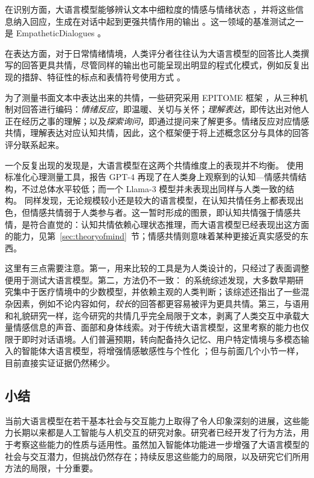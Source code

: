 在识别方面，大语言模型能够辨认文本中细粒度的情感与情绪状态 \citep{broekens2023fine}，并将这些信息纳入回应，生成在对话中起到更强共情作用的输出 \citep{yang2024enhancing, yan2024talkhumanlikeagentsempathetic}。这一领域的基准测试之一是 EmpatheticDialogues \citep{rashkin2019towards}。

在表达方面，对于日常情绪情境，人类评分者往往认为大语言模型的回答比人类撰写的回答更具共情，尽管同样的输出也可能呈现出明显的程式化模式，例如反复出现的措辞、特征性的标点和表情符号使用方式 \citep{lee2024large}。

为了测量书面文本中表达出来的共情，一些研究采用 EPITOME 框架 \citep{sharma2020computational}，从三种机制对回答进行编码：\emph{情绪反应}，即温暖、关切与关怀；\emph{理解表达}，即传达出对他人正在经历之事的理解；以及\emph{探索询问}，即通过提问来了解更多。情绪反应对应情感共情，理解表达对应认知共情，因此，这个框架便于将上述概念区分与具体的回答评分联系起来。

一个反复出现的发现是，大语言模型在这两个共情维度上的表现并不均衡。\citet{yu2025can} 使用标准化心理测量工具，报告 GPT-4 再现了在人类身上观察到的认知—情感共情结构，不过总体水平较低；而一个 Llama-3 模型并未表现出同样与人类一致的结构。\citet{williams2025heartificial} 同样发现，无论规模较小还是较大的语言模型，在认知共情任务上都表现出色，但情感共情弱于人类参与者。这一暂时形成的图景，即认知共情强于情感共情，是符合直觉的：认知共情依赖心理状态推理，而大语言模型已经表现出这方面的能力，见第~\ref{sec:theoryofmind}~节；情感共情则意味着某种更接近真实感受的东西。

这里有三点需要注意。第一，用来比较的工具是为人类设计的，只经过了表面调整便用于测试大语言模型。第二，方法仍不一致：\citet{sorin2024large} 的系统综述发现，大多数早期研究集中于医疗情境中的少数模型，并依赖主观的人类判断；该综述还指出了一些混杂因素，例如不论内容如何，\emph{较长}的回答都更容易被评为更具共情。第三，与语用和礼貌研究一样，迄今研究的共情几乎完全局限于文本，剥离了人类交互中承载大量情感信息的声音、面部和身体线索。对于传统大语言模型，这里考察的能力也仅限于即时对话语境。人们普遍预期，转向配备持久记忆、用户特定情境与多模态输入的智能体大语言模型，将增强情感敏感性与个性化 \citep{sravanthi2024-pub}；但与前面几个小节一样，目前直接实证证据仍然稀少。

\subsection{小结}
当前大语言模型在若干基本社会与交互能力上取得了令人印象深刻的进展，这些能力长期以来都是人工智能与人机交互的研究对象。研究者已经开发了行为方法，用于考察这些能力的性质与适用性。虽然加入智能体功能进一步增强了大语言模型的社会与交互潜力，但挑战仍然存在；持续反思这些能力的局限，以及研究它们所用方法的局限，十分重要。

